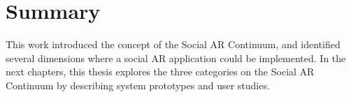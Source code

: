 





\section{Summary}

This work introduced the concept of the Social AR Continuum, and identified several dimensions where a social AR application could be implemented.
In the next chapters, this thesis explores the three categories on the Social AR Continuum by describing system prototypes and user studies. 

